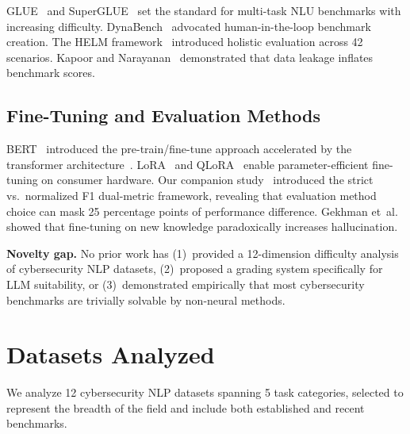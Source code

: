 \documentclass[journal]{IEEEtran}
\begin{document}
GLUE~\cite{wang2018glue} and SuperGLUE~\cite{wang2019} set the standard for multi-task NLU benchmarks with increasing difficulty. DynaBench~\cite{kiela2021} advocated human-in-the-loop benchmark creation. The HELM framework~\cite{liang2022} introduced holistic evaluation across 42 scenarios. Kapoor and Narayanan~\cite{kapoor2023} demonstrated that data leakage inflates benchmark scores.

\subsection{Fine-Tuning and Evaluation Methods}
BERT~\cite{devlin2019} introduced the pre-train/fine-tune approach accelerated by the transformer architecture~\cite{vaswani2017}. LoRA~\cite{hu2022} and QLoRA~\cite{dettmers2023} enable parameter-efficient fine-tuning on consumer hardware. Our companion study~\cite{p3} introduced the strict vs.\ normalized F1 dual-metric framework, revealing that evaluation method choice can mask 25 percentage points of performance difference. Gekhman et~al.~\cite{gekhman2024} showed that fine-tuning on new knowledge paradoxically increases hallucination.

\textbf{Novelty gap.} No prior work has (1)~provided a 12-dimension difficulty analysis of cybersecurity NLP datasets, (2)~proposed a grading system specifically for LLM suitability, or (3)~demonstrated empirically that most cybersecurity benchmarks are trivially solvable by non-neural methods.

\section{Datasets Analyzed}

We analyze 12 cybersecurity NLP datasets spanning 5 task categories, selected to represent the breadth of the field and include both established and recent benchmarks.
\end{document}

